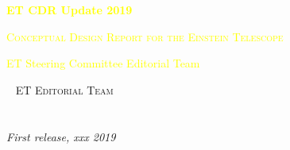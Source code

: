 
\begingroup
\thispagestyle{empty}

\centering
\par\normalfont\fontsize{50}{50}\sffamily\selectfont
\textcolor{yellow}{\textbf{ET CDR Update 2019}}\\
\vskip6.5cm
\par\normalfont\fontsize{25}{25}\sffamily\selectfont
\textsc{\textcolor{yellow}{{Conceptual Design Report for the Einstein Telescope}}}\par %
\vskip4cm
\textcolor{yellow}{\LARGE ET Steering Committee Editorial Team}\par %
\endgroup


\newpage
~\vfill
\thispagestyle{empty}
\noindent \textsc{ET Editorial Team}\\
\noindent \textsc{}\\ %
\noindent \\ %

\noindent \textit{First release, xxx 2019} %
\newpage


\pagestyle{empty} %
\tableofcontents %
\pagestyle{fancy} %
